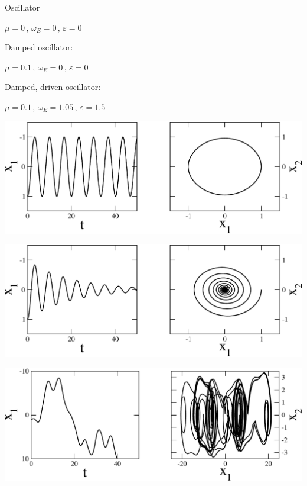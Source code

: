 \begin{frame}[fragile]

 \vspace{2ex}

\begin{minipage}[t]{0.5\textwidth}
\vspace{0pt}
Oscillator

\vspace{1ex}
$\mu=0 \, \text{,} \,\, \omega_E = 0 \, \text{,} \,\, \varepsilon=0$

\vspace{7ex}
Damped oscillator:

\vspace{1ex}
$\mu=0.1  \, \text{,} \,\, \omega_E = 0  \, \text{,} \,\, \varepsilon=0$

\vspace{7ex}
Damped, driven oscillator:

\vspace{1ex}
$\mu=0.1  \, \text{,} \,\, \omega_E = 1.05  \, \text{,} \,\, \varepsilon=1.5$
\end{minipage} %
\begin{minipage}[t]{0.49\textwidth}
\vspace{0pt}
\centerline{\includegraphics[draft=false,width=1.0\textwidth]{undamped.pdf}}

\vspace{2.5ex}
\centerline{\includegraphics[draft=false,width=1.0\textwidth]{damped.pdf}}

\vspace{2.5ex}
\centerline{\includegraphics[draft=false,width=1.0\textwidth]{damped_driven.pdf}}
\end{minipage}


\end{frame}
